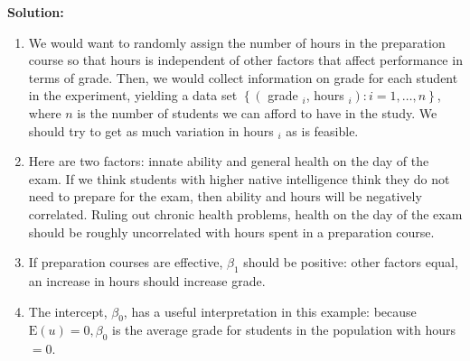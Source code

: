 \documentclass[12pt]{article}
\begin{document}
\begin{enumerate}
{\color{blue}
\noindent \textbf{Solution:}

\begin{enumerate}
    \item We would want to randomly assign the number of hours in the preparation course so that hours is independent of other factors that affect performance in terms of grade. Then, we would collect information on grade for each student in the experiment, yielding a data set $\left\{\left(\right.\right.$ grade $_i$, hours $\left.\left._i\right): i=1, \ldots, n\right\}$, where $n$ is the number of students we can afford to have in the study. We should try to get as much variation in hours ${ }_i$ as is feasible.

    \item Here are two factors: innate ability and general health on the day of the exam. If we think students with higher native intelligence think they do not need to prepare for the exam, then ability and hours will be negatively correlated. Ruling out chronic health problems, health on the day of the exam should be roughly uncorrelated with hours spent in a preparation course.
    \item If preparation courses are effective, $\beta_1$ should be positive: other factors equal, an increase in hours should increase grade.
 \item The intercept, $\beta_0$, has a useful interpretation in this example: because $\mathrm{E}(u)=0, \beta_0$ is the average grade for students in the population with hours $=0$.

    \end{enumerate}

}



\end{enumerate}
\end{document}

